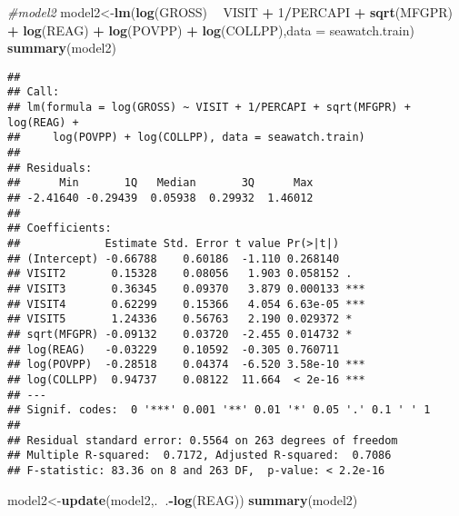 \documentclass[]{article}
\newenvironment{Shaded}{\begin{snugshade}}{\end{snugshade}}
\newcommand{\KeywordTok}[1]{\textcolor[rgb]{0.13,0.29,0.53}{\textbf{#1}}}
\newcommand{\DataTypeTok}[1]{\textcolor[rgb]{0.13,0.29,0.53}{#1}}
\newcommand{\DecValTok}[1]{\textcolor[rgb]{0.00,0.00,0.81}{#1}}
\newcommand{\StringTok}[1]{\textcolor[rgb]{0.31,0.60,0.02}{#1}}
\newcommand{\CommentTok}[1]{\textcolor[rgb]{0.56,0.35,0.01}{\textit{#1}}}
\newcommand{\OperatorTok}[1]{\textcolor[rgb]{0.81,0.36,0.00}{\textbf{#1}}}
\newcommand{\NormalTok}[1]{#1}
\begin{document}
\begin{Shaded}
\begin{Highlighting}[]
\CommentTok{#model2}
\NormalTok{model2<-}\KeywordTok{lm}\NormalTok{(}\KeywordTok{log}\NormalTok{(GROSS) }\OperatorTok{~}\StringTok{ }\NormalTok{VISIT }\OperatorTok{+}\StringTok{ }\DecValTok{1}\OperatorTok{/}\NormalTok{PERCAPI }\OperatorTok{+}\StringTok{ }\KeywordTok{sqrt}\NormalTok{(MFGPR) }\OperatorTok{+}\StringTok{ }\KeywordTok{log}\NormalTok{(REAG) }\OperatorTok{+}\StringTok{ }\KeywordTok{log}\NormalTok{(POVPP) }\OperatorTok{+}\StringTok{ }\KeywordTok{log}\NormalTok{(COLLPP),}\DataTypeTok{data =}\NormalTok{ seawatch.train)}
\KeywordTok{summary}\NormalTok{(model2)}
\end{Highlighting}
\end{Shaded}

\begin{verbatim}
## 
## Call:
## lm(formula = log(GROSS) ~ VISIT + 1/PERCAPI + sqrt(MFGPR) + log(REAG) + 
##     log(POVPP) + log(COLLPP), data = seawatch.train)
## 
## Residuals:
##      Min       1Q   Median       3Q      Max 
## -2.41640 -0.29439  0.05938  0.29932  1.46012 
## 
## Coefficients:
##             Estimate Std. Error t value Pr(>|t|)    
## (Intercept) -0.66788    0.60186  -1.110 0.268140    
## VISIT2       0.15328    0.08056   1.903 0.058152 .  
## VISIT3       0.36345    0.09370   3.879 0.000133 ***
## VISIT4       0.62299    0.15366   4.054 6.63e-05 ***
## VISIT5       1.24336    0.56763   2.190 0.029372 *  
## sqrt(MFGPR) -0.09132    0.03720  -2.455 0.014732 *  
## log(REAG)   -0.03229    0.10592  -0.305 0.760711    
## log(POVPP)  -0.28518    0.04374  -6.520 3.58e-10 ***
## log(COLLPP)  0.94737    0.08122  11.664  < 2e-16 ***
## ---
## Signif. codes:  0 '***' 0.001 '**' 0.01 '*' 0.05 '.' 0.1 ' ' 1
## 
## Residual standard error: 0.5564 on 263 degrees of freedom
## Multiple R-squared:  0.7172, Adjusted R-squared:  0.7086 
## F-statistic: 83.36 on 8 and 263 DF,  p-value: < 2.2e-16
\end{verbatim}

\begin{Shaded}
\begin{Highlighting}[]
\NormalTok{model2<-}\KeywordTok{update}\NormalTok{(model2,.}\OperatorTok{~}\NormalTok{.}\OperatorTok{-}\KeywordTok{log}\NormalTok{(REAG))}
\KeywordTok{summary}\NormalTok{(model2)}
\end{Highlighting}
\end{Shaded}
\end{document}
